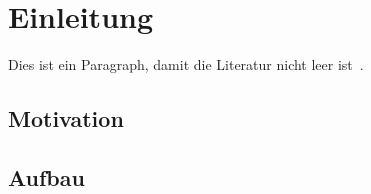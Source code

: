 
\setcounter{page}{1}

\section{Einleitung}
\label{sec:einleitung}

\lipsum[1]

Dies ist ein Paragraph, damit die Literatur nicht leer ist~\cite{atlassianGitflowWorkflow}.




\subsection{Motivation}
\label{sec:einleitung:motivation}

\lipsum[2]




\subsection{Aufbau}
\label{sec:einleitung:aufbau}

\lipsum[3]
